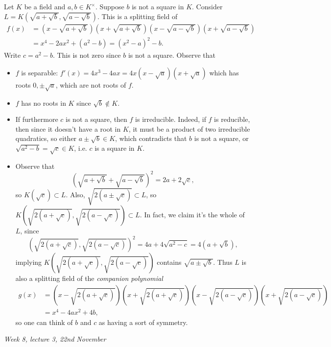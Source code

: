\documentclass{article}
\theoremstyle{definition}
\begin{document}
Let $K$ be a field and $a,b\in K^\times$. Suppose $b$ is not a square in $K$. Consider $L=K\left(\sqrt{a+\sqrt{b}},\sqrt{a-\sqrt{b}}\right)$. This is a splitting field of
\[
\begin{aligned}
f(x)&=\left(x-\sqrt{a+\sqrt b}\right)\left(x+\sqrt{a+\sqrt b}\right)\left(x-\sqrt{a-\sqrt b}\right)\left(x+\sqrt{a-\sqrt b}\right) \\
&=x^4-2ax^2+(a^2-b)=(x^2-a)^2-b .
\end{aligned}
\]
Write $c=a^2-b$. This is not zero since $b$ is not a square. Observe that
\begin{itemize}
\item $f$ is separable: $f'(x)=4x^3-4ax=4x\left(x-\sqrt a\right)\left(x+\sqrt a\right)$ which has roots $0,\pm\sqrt a$, which are not roots of $f$.
\item $f$ has no roots in $K$ since $\sqrt b\notin K$.
\item If furthermore $c$ is not a square, then $f$ is irreducible. Indeed, if $f$ is reducible, then since it doesn't have a root in $K$, it must be a product of two irreducible quadratics, so either $a\pm\sqrt b\in K$, which contradicts that $b$ is not a square, or $\sqrt{a^2-b}=\sqrt c\in K$, i.e. $c$ is a square in $K$.
\item Observe that
\[
\left(\sqrt{a+\sqrt b}+\sqrt{a-\sqrt b}\right)^2=2a+2\sqrt c,
\]
so $K\left(\sqrt c\right)\subset L$. Also, $\sqrt{2\left(a\pm\sqrt c\right)}\subset L$, so $K\left(\sqrt{2\left(a+\sqrt c\right)},\sqrt{2\left(a-\sqrt c\right)}\right)\subset L$. In fact, we claim it's the whole of $L$, since
\[
\left(\sqrt{2(a+\sqrt c)},\sqrt{2\left(a-\sqrt c\right)}\right)^2=4a+4\sqrt{a^2-c}=4(a+\sqrt b),
\]
implying $K\left(\sqrt{2\left(a+\sqrt c\right)},\sqrt{2\left(a-\sqrt c\right)}\right)$ contains $\sqrt{a\pm\sqrt b}$. Thus $L$ is also a splitting field of the \textit{companion polynomial}
\[
\begin{aligned}
g(x)&=\left(x-\sqrt{2\left(a+\sqrt c\right)}\right)\left(x+\sqrt{2\left(a+\sqrt c\right)}\right)\left(x-\sqrt{2\left(a-\sqrt c\right)}\right)\left(x+\sqrt{2\left(a-\sqrt c\right)}\right) \\
&=x^4-4ax^2+4b,
\end{aligned}
\]
so one can think of $b$ and $c$ as having a sort of symmetry.
\end{itemize}

\begin{flushright}
\textit{Week 8, lecture 3, 22nd November}
\end{flushright}
\end{document}
